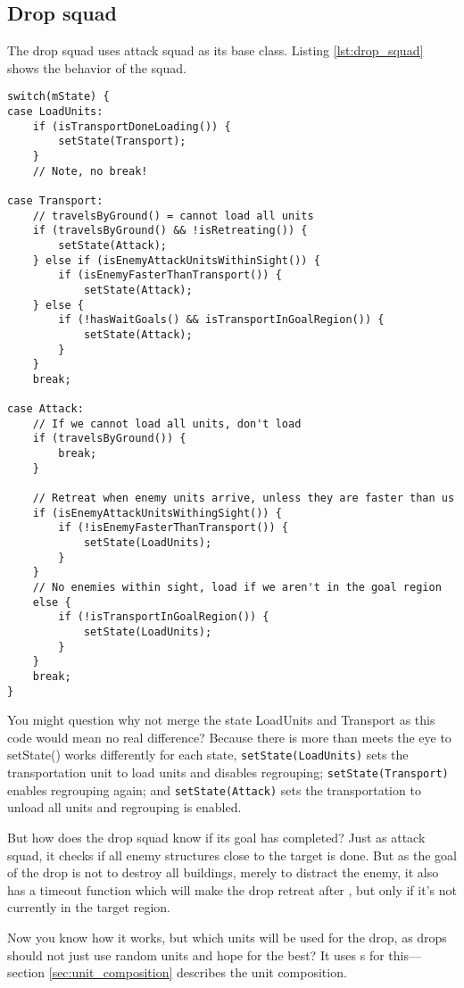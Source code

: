 \subsection{Drop squad}
\label{sec:drop_squad}
The drop squad uses attack squad as its base class. Listing \ref{lst:drop_squad} shows the behavior of the squad.
\begin{lstlisting}[caption={Drop squad behavior.},label={lst:drop_squad}]
switch(mState) {
case LoadUnits:
	if (isTransportDoneLoading()) {
		setState(Transport);
	}
	// Note, no break!

case Transport:
	// travelsByGround() = cannot load all units
	if (travelsByGround() && !isRetreating()) {
		setState(Attack);
	} else if (isEnemyAttackUnitsWithinSight()) {
		if (isEnemyFasterThanTransport()) {
			setState(Attack);
	} else {
		if (!hasWaitGoals() && isTransportInGoalRegion()) {
			setState(Attack);
		}
	}
	break;

case Attack:
	// If we cannot load all units, don't load
	if (travelsByGround()) {
		break;
	}

	// Retreat when enemy units arrive, unless they are faster than us
	if (isEnemyAttackUnitsWithingSight()) {
		if (!isEnemyFasterThanTransport()) {
			setState(LoadUnits);
		}
	}
	// No enemies within sight, load if we aren't in the goal region
	else {
		if (!isTransportInGoalRegion()) {
			setState(LoadUnits);
		}
	}
	break;
}
\end{lstlisting}
You might question why not merge the state LoadUnits and Transport as this code would mean no real difference? Because there is more than meets the eye to setState() works differently for each state, \texttt{setState(LoadUnits)} sets the transportation unit to load units and disables regrouping; \texttt{setState(Transport)} enables regrouping again; and \texttt{setState(Attack)} sets the transportation to unload all units and regrouping is enabled.

But how does the drop squad know if its goal has completed? Just as attack squad, it checks if all enemy structures close to the target is done. But as the goal of the drop is not to destroy all buildings, merely to distract the enemy, it also has a timeout function which will make the drop retreat after \squadDropAttackTimeout, but only if it's not currently in the target region.

Now you know how it works, but which units will be used for the drop, as drops should not just use random units and hope for the best? It uses s for this—section \ref{sec:unit_composition} describes the unit composition. 

